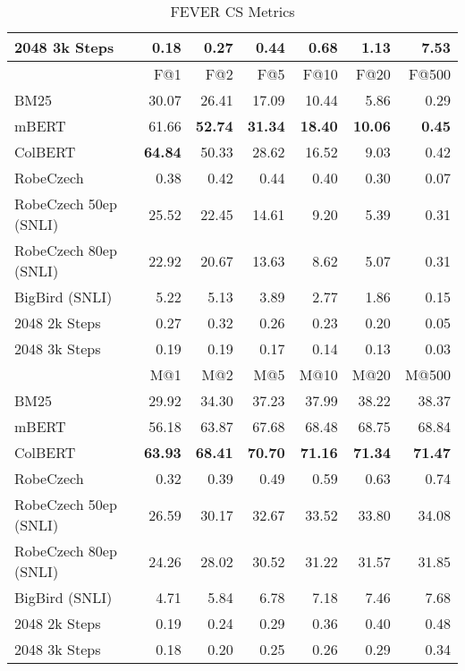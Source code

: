 \begin{table}[!htb]
\begin{tabular}{lrrrrrr}
\nystr{} 2048 3k Steps &   0.18 &   0.27 &   0.44 &   0.68 &   1.13 &   7.53 \\
        \midrule
              {} &    F@1 &    F@2 &    F@5 &   F@10 &   F@20 &   F@500 \\
        \midrule
                  BM25 &  30.07 &  26.41 &  17.09 &  10.44 &   5.86 &    0.29 \\
                 mBERT &  61.66 &  \bf{52.74} &  \bf{31.34} &  \bf{18.40} &  \bf{10.06} &    \bf{0.45} \\
               ColBERT &  \bf{64.84} &  50.33 &  28.62 &  16.52 &   9.03 &    0.42 \\
             RobeCzech &   0.38 &   0.42 &   0.44 &   0.40 &   0.30 &    0.07 \\
 RobeCzech 50ep (SNLI) &  25.52 &  22.45 &  14.61 &   9.20 &   5.39 &    0.31 \\
 RobeCzech 80ep (SNLI) &  22.92 &  20.67 &  13.63 &   8.62 &   5.07 &    0.31 \\
        BigBird (SNLI) &   5.22 &   5.13 &   3.89 &   2.77 &   1.86 &    0.15 \\
\nystr{} 2048 2k Steps &   0.27 &   0.32 &   0.26 &   0.23 &   0.20 &    0.05 \\
\nystr{} 2048 3k Steps &   0.19 &   0.19 &   0.17 &   0.14 &   0.13 &    0.03 \\
        \midrule
              {} &  M@1 &  M@2 &  M@5 &  M@10 &  M@20 &  M@500 \\
        \midrule
                  BM25 &  29.92 &  34.30 &  37.23 &   37.99 &   38.22 &    38.37 \\
                 mBERT &  56.18 &  63.87 &  67.68 &   68.48 &   68.75 &    68.84 \\
               ColBERT &  \bf{63.93} &  \bf{68.41} &  \bf{70.70} &   \bf{71.16} &   \bf{71.34} &    \bf{71.47} \\
             RobeCzech &   0.32 &   0.39 &   0.49 &    0.59 &    0.63 &     0.74 \\
 RobeCzech 50ep (SNLI) &  26.59 &  30.17 &  32.67 &   33.52 &   33.80 &    34.08 \\
 RobeCzech 80ep (SNLI) &  24.26 &  28.02 &  30.52 &   31.22 &   31.57 &    31.85 \\
        BigBird (SNLI) &   4.71 &   5.84 &   6.78 &    7.18 &    7.46 &     7.68 \\
\nystr{} 2048 2k Steps &   0.19 &   0.24 &   0.29 &    0.36 &    0.40 &     0.48 \\
\nystr{} 2048 3k Steps &   0.18 &   0.20 &   0.25 &    0.26 &    0.29 &     0.34 \\
        \bottomrule
        \end{tabular}
    \caption[FEVER CS Metrics]{FEVER CS Metrics}
\end{table}

